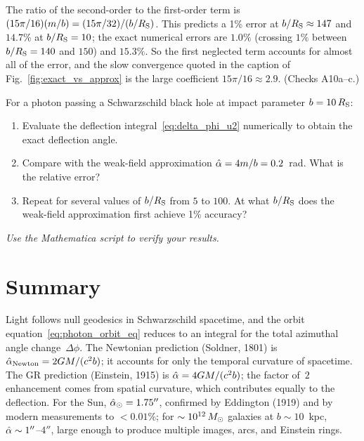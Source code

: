 \begin{annotation}
The ratio of the second-order to the first-order term is
$(15\pi/16)(m/b) = (15\pi/32)/(b/R_{\mathrm{S}})$.  This predicts a 1\% error at
$b/R_{\mathrm{S}} \approx 147$ and $14.7\%$ at $b/R_{\mathrm{S}} = 10$; the exact numerical errors are
$1.0\%$ (crossing $1\%$ between $b/R_{\mathrm{S}} = 140$ and $150$) and $15.3\%$.  So the
first neglected term accounts for almost all of the error, and the slow
convergence quoted in the caption of Fig.~\ref{fig:exact_vs_approx} is the
large coefficient $15\pi/16 \approx 2.9$.  (Checks A10a--c.)
\end{annotation}
\begin{exercise}
\label{ex:exact_vs_approx}
For a photon passing a Schwarzschild black hole at impact parameter
$b = 10\,R_{\mathrm{S}}$:
\begin{enumerate}[label=(\alph*)]
    \item Evaluate the deflection integral~\eqref{eq:delta_phi_u2}
          numerically to obtain the exact deflection angle.
    \item Compare with the weak-field approximation
          $\hat{\alpha} = 4m/b = 0.2$~rad.  What is the relative error?
    \item Repeat for several values of $b/R_{\mathrm{S}}$ from $5$ to $100$.  At what
          $b/R_{\mathrm{S}}$ does the weak-field approximation first achieve 1\%
          accuracy?
\end{enumerate}
\textit{Use the Mathematica script}
\textit{to verify your results.}
\end{exercise}


\section{Summary}
\label{sec:deflection_summary}

Light follows null geodesics in Schwarzschild spacetime, and the orbit
equation~\eqref{eq:photon_orbit_eq} reduces to an integral for the total
azimuthal angle change~$\Delta\phi$.  The Newtonian prediction (Soldner,
1801) is $\hat{\alpha}_{\mathrm{Newton}} = 2G M /
(c^2 b)$; it accounts for only the temporal curvature of
spacetime.  The GR prediction (Einstein, 1915) is
$\hat{\alpha} = 4G M / (c^2 b)$; the factor of~$2$
enhancement comes from spatial curvature, which contributes equally to
the deflection.  For the Sun, $\hat{\alpha}_\odot = 1.75''$, confirmed by
Eddington (1919) and by modern measurements to $< 0.01\%$; for
$\sim 10^{12}\,M_{\odot}$ galaxies at $b \sim 10$~kpc, $\hat{\alpha} \sim
1''$--$4''$, large enough to produce multiple images, arcs, and Einstein
rings.

